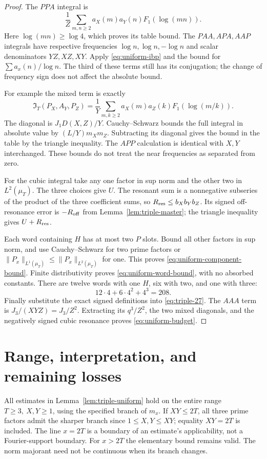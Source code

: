 \documentclass[11pt]{article}
\newcommand{\IT}{\mathfrak I_T}
\begin{document}
\begin{proof}
The \(PPA\) integral is
\[
 \frac1Z\sum_{m,n\geq2}a_X(m)a_Y(n)F_1(\log(mn)).
\]
Here \(\log(mn)\geq\log4\), which proves its table bound.
The \(PAA,APA,AAP\) integrals have respective frequencies
\(\log n,\log n,-\log n\) and scalar denominators \(YZ,XZ,XY\).
Apply \eqref{eq:uniform-ibp} and the bound for
\(\sum a_x(n)/\log n\). The third of these terms still has its conjugation;
the change of frequency sign does not affect the absolute bound.

For example the mixed term is exactly
\[
 \IT(P_X,A_Y,P_Z)=
 \frac1Y\sum_{m,k\geq2}a_X(m)a_Z(k)F_1(\log(m/k)).
\]
The diagonal is \(J_1D(X,Z)/Y\). Cauchy--Schwarz bounds the
full integral in absolute value by \((L/Y)m_Xm_Z\).
Subtracting its diagonal gives the bound in the table by the triangle
inequality. The \(APP\) calculation is identical with \(X,Y\) interchanged.
These bounds do not treat the near frequencies as separated from zero.

For the cubic integral take any one factor in sup norm and the other two
in \(L^2(\mu_T)\). The three choices give \(U\).
The resonant sum is a nonnegative subseries of the product of the three
coefficient sums, so \(R_{\rm res}\leq b_Xb_Yb_Z\). Its signed
off-resonance error is \(-R_{\rm off}\) from Lemma~\ref{lem:triple-master};
the triangle inequality gives \(U+R_{\rm res}\).

Each word containing \(H\) has at most two \(P\) slots. Bound all other
factors in sup norm, and use Cauchy--Schwarz for two prime factors or
\(\|P_x\|_{L^1(\mu_T)}\leq\|P_x\|_{L^2(\mu_T)}\) for one.
This proves \eqref{eq:uniform-component-bound}. Finite distributivity
proves \eqref{eq:uniform-word-bound}, with no absorbed constants.
There are twelve words with one \(H\), six with two, and one with three:
\[
 12\cdot4+6\cdot4^2+4^3=208.
\]
Finally substitute the exact signed definitions into
\eqref{eq:triple-27}. The \(AAA\) term is \(J_3/(XYZ)=J_3/Z^2\).
Extracting its \(q^3/Z^2\), the two mixed diagonals, and the negatively
signed cubic resonance proves \eqref{eq:uniform-budget}.
\end{proof}

\section{Range, interpretation, and remaining losses}

All estimates in Lemma~\ref{lem:triple-uniform} hold on the entire range
\(T\geq3,\ X,Y\geq1\), using the specified branch of \(m_x\).
If \(XY\leq2T\), all three prime factors admit the sharper branch since
\(1\leq X,Y\leq XY\); equality \(XY=2T\) is included.
The line \(x=2T\) is a boundary of an estimate's applicability, not a
Fourier-support boundary. For \(x>2T\) the elementary bound remains valid.
The norm majorant need not be continuous when its branch changes.
\end{document}
